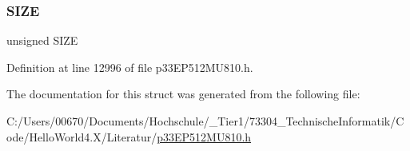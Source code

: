 \subsubsection{\texorpdfstring{S\+I\+ZE}{SIZE}}
{\footnotesize\ttfamily unsigned S\+I\+ZE}



Definition at line 12996 of file p33\+E\+P512\+M\+U810.\+h.



The documentation for this struct was generated from the following file\+:\begin{DoxyCompactItemize}
\item 
C\+:/\+Users/00670/\+Documents/\+Hochschule/\+\_\+\+Tier1/73304\+\_\+\+Technische\+Informatik/\+Code/\+Hello\+World4.\+X/\+Literatur/\hyperlink{p33_e_p512_m_u810_8h}{p33\+E\+P512\+M\+U810.\+h}\end{DoxyCompactItemize}
